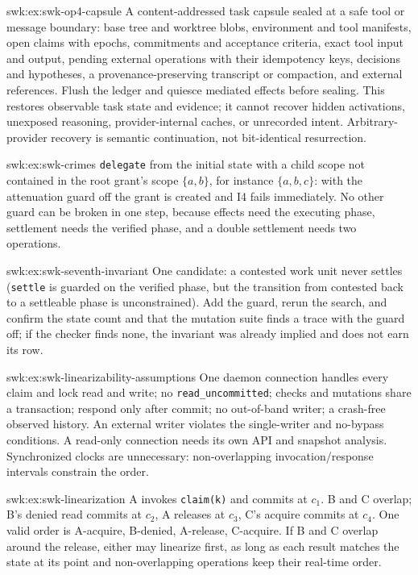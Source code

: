 \begin{pdSolution}{swk:ex:swk-op4-capsule}
A content-addressed task capsule sealed at a safe tool or message boundary: base tree and worktree blobs, environment and tool manifests, open claims with epochs, commitments and acceptance criteria, exact tool input and output, pending external operations with their idempotency keys, decisions and hypotheses, a provenance-preserving transcript or compaction, and external references. Flush the ledger and quiesce mediated effects before sealing. This restores observable task state and evidence; it cannot recover hidden activations, unexposed reasoning, provider-internal caches, or unrecorded intent. Arbitrary-provider recovery is semantic continuation, not bit-identical resurrection.
\end{pdSolution}
\begin{pdSolution}{swk:ex:swk-crimes}
\texttt{delegate} from the initial state with a child scope not contained in the root grant's scope $\{a,b\}$, for instance $\{a,b,c\}$: with the attenuation guard off the grant is created and I4 fails immediately. No other guard can be broken in one step, because effects need the executing phase, settlement needs the verified phase, and a double settlement needs two operations.
\end{pdSolution}
\begin{pdSolution}{swk:ex:swk-seventh-invariant}
One candidate: a contested work unit never settles (\texttt{settle} is guarded on the verified phase, but the transition from contested back to a settleable phase is unconstrained). Add the guard, rerun the search, and confirm the state count and that the mutation suite finds a trace with the guard off; if the checker finds none, the invariant was already implied and does not earn its row.
\end{pdSolution}
\begin{pdSolution}{swk:ex:swk-linearizability-assumptions}
One daemon connection handles every claim and lock read and write; no \texttt{read\_uncommitted}; checks and mutations share a transaction; respond only after commit; no out-of-band writer; a crash-free observed history. An external writer violates the single-writer and no-bypass conditions. A read-only connection needs its own API and snapshot analysis. Synchronized clocks are unnecessary: non-overlapping invocation/response intervals constrain the order.
\end{pdSolution}
\begin{pdSolution}{swk:ex:swk-linearization}
A invokes \texttt{claim(k)} and commits at $c_1$. B and C overlap; B's denied read commits at $c_2$, A releases at $c_3$, C's acquire commits at $c_4$. One valid order is A-acquire, B-denied, A-release, C-acquire. If B and C overlap around the release, either may linearize first, as long as each result matches the state at its point and non-overlapping operations keep their real-time order.
\end{pdSolution}
